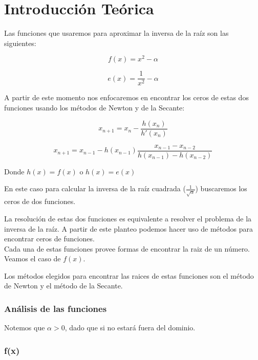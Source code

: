 \section{Introducción Teórica}

Las funciones que usaremos para aproximar la inversa de la raíz son las siguientes:

\begin{displaymath}
    f(x) = x^2 - \alpha
\end{displaymath}

\begin{displaymath}
    e(x) = \frac{1}{x^2} - \alpha
\end{displaymath}

A partir de este momento nos enfocaremos en encontrar los ceros de estas dos funciones usando los métodos de Newton y de la Secante:

\begin{displaymath}
    x_{n + 1} = x_n - \frac{h(x_n)}{h'(x_n)}
\end{displaymath}

\begin{displaymath}
    x_{n + 1} = x_{n - 1} - h(x_{n - 1})\frac{x_{n - 1} - x_{n - 2}}{h(x_{n - 1}) - h(x_{n - 2})}
\end{displaymath}

Donde $\displaystyle h(x) = f(x)$ o $\displaystyle h(x) = e(x)$

En este caso para calcular la inversa de la raíz cuadrada
($\displaystyle\frac{1}{\sqrt{\alpha}}$) buscaremos los ceros de dos funciones.

La resolución de estas dos funciones es equivalente a resolver el problema de la
inversa de la raíz. A partir de este planteo
podemos hacer uso de métodos para encontrar ceros de funciones.\\

Cada una de estas funciones provee formas de encontrar la raiz de un número.
Veamos el caso de $f(x)$.

Los métodos elegidos para encontrar las raices de estas funciones son el método
de Newton y el método de la Secante.

\subsubsection{Análisis de las funciones}

Notemos que $\alpha > 0$, dado que si no estará fuera del dominio.

\subsubsection{f(x)}


